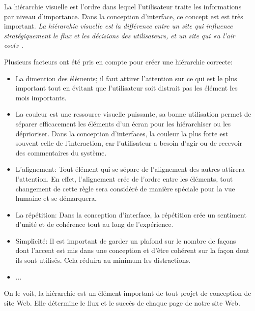 La hiérarchie visuelle est l'ordre dans lequel l'utilisateur traite les informations par niveau d'importance.
Dans la conception d'interface, ce concept est est très important.
\textit{La hiérarchie visuelle est la différence entre un site qui influence stratégiquement le flux et les 
décisions des utilisateurs, et un site qui «a l'air cool» \cite{cao20155}.}
\par 
Plusieurs facteurs ont été pris en compte pour créer une hiérarchie correcte:
\begin{itemize}
        \item La dimention des éléments; il faut attirer l'attention sur ce qui est le plus important
        tout en évitant que l'utilisateur soit distrait pas les élément les mois importants.
        \item La couleur est une ressource visuelle puissante, sa bonne utilisation permet de séparer 
        efficacement les éléments d'un écran pour les hiérarchiser ou les déprioriser. Dans la 
        conception d’interfaces, la couleur la plus forte est souvent celle de l’interaction, 
        car l’utilisateur a besoin d’agir ou de recevoir des commentaires du système.
        \item L'alignement: Tout élément qui se sépare de l'alignement des autres attirera l'attention. 
        En effet, l'alignement crée de l'ordre entre les éléments, tout changement de cette règle sera 
        considéré de manière spéciale pour la vue humaine et se démarquera.
        \item La répétition: Dans la conception d'interface, la répétition crée un sentiment 
        d'unité et de cohérence tout au long de l'expérience.
        \item Simplicité: Il est important de garder un plafond sur le nombre de façons dont l'accent est
         mis dans une conception et d'être cohérent sur la façon dont ils sont utilisés. 
         Cela réduira au minimum les distractions.
        \item ...\cite{design}

\end{itemize}
On le voit, la hiérarchie est un élément important de tout projet de conception de site Web. 
Elle détermine le flux et le succès de chaque page de notre site Web.


